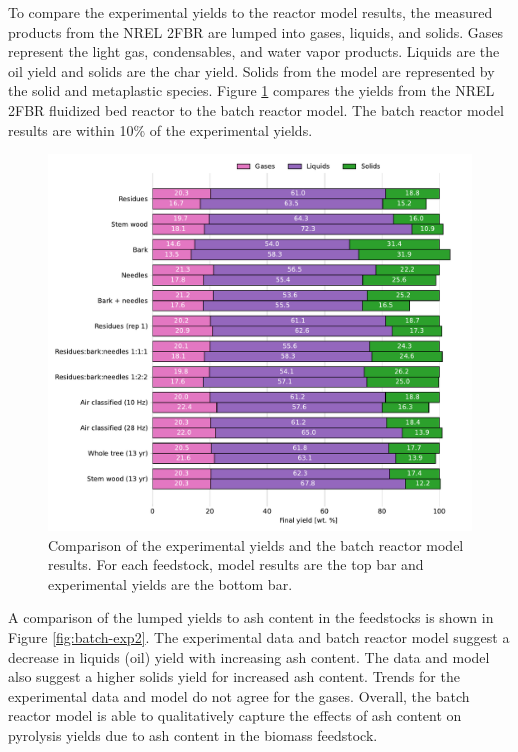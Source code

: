 To compare the experimental yields to the reactor model results, the measured products from the NREL 2FBR are lumped into gases, liquids, and solids. Gases represent the light gas, condensables, and water vapor products. Liquids are the oil yield and solids are the char yield. Solids from the model are represented by the solid and metaplastic species. Figure \ref{fig:batch-exp1} compares the yields from the NREL 2FBR fluidized bed reactor to the batch reactor model. The batch reactor model results are within 10\% of the experimental yields.

\begin{figure}[H]
    \centering
    \includegraphics[width=\textwidth]{figures/batch-exp1.pdf}
    \caption{Comparison of the experimental yields and the batch reactor model results. For each feedstock, model results are the top bar and experimental yields are the bottom bar.}
    \label{fig:batch-exp1}
\end{figure}

A comparison of the lumped yields to ash content in the feedstocks is shown in Figure \ref{fig:batch-exp2}. The experimental data and batch reactor model suggest a decrease in liquids (oil) yield with increasing ash content. The data and model also suggest a higher solids yield for increased ash content. Trends for the experimental data and model do not agree for the gases. Overall, the batch reactor model is able to qualitatively capture the effects of ash content on pyrolysis yields due to ash content in the biomass feedstock.

